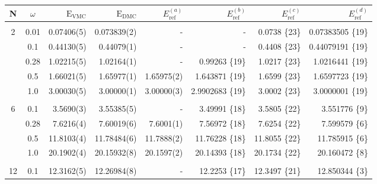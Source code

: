 % 


\setlength{\tabcolsep}{5pt}
\begin{table}
\begin{center}
\begin{tabular}{cc|rrrrrr}
    N     & $\omega$ & $\mathrm{E_{VMC}}$ & $\mathrm{E_{DMC}}$ & $E_\mathrm{ref}^{(a)}$& $E_\mathrm{ref}^{(b)}$ & $E_\mathrm{ref}^{(c)}$ & $E_\mathrm{ref}^{(d)}$\\
\hline\hline
\multicolumn{8}{c}{} \\
    2     &   0.01   & 0.07406(5)  & 0.073839(2)  & -		& -			& 0.0738 \{23\} & 0.07383505 \{19\}\\
          &   0.1    & 0.44130(5)  & 0.44079(1)   & - 		& - 			& 0.4408 \{23\} & 0.44079191 \{19\}\\
          &   0.28   & 1.02215(5)  & 1.02164(1)   & -		&0.99263 \{19\} 	& 1.0217 \{23\}  & 1.0216441 \{19\}\\
          &   0.5    & 1.66021(5)  & 1.65977(1)   & 1.65975(2)&1.643871 \{19\}	& 1.6599 \{23\}  & 1.6597723 \{19\}\\
          &   1.0    & 3.00030(5)  & 3.00000(1)   & 3.00000(3)&2.9902683 \{19\}	& 3.0002 \{23\}  & 3.0000001 \{19\}\\
\cline{2-8}
\multicolumn{8}{c}{} \\
    6     &   0.1    &  3.5690(3)  &  3.55385(5)  & -		&3.49991 \{18\} 	& 3.5805 \{22\}  & 3.551776 \{9\}\\
          &   0.28   &  7.6216(4)  &  7.60019(6)  & 7.6001(1) &7.56972 \{18\} 	& 7.6254 \{22\}  & 7.599579 \{6\}\\
          &   0.5    & 11.8103(4)  & 11.78484(6)  & 11.7888(2)&11.76228 \{18\}	& 11.8055 \{22\} & 11.785915 \{6\}\\
          &   1.0    & 20.1902(4)  & 20.15932(8)  & 20.1597(2)&20.14393 \{18\}	& 20.1734 \{22\} & 20.160472 \{8\}\\
\cline{2-8}
\multicolumn{8}{c}{} \\
    12    &   0.1    & 12.3162(5)  & 12.26984(8)  & - 		&12.2253 \{17\} 	& 12.3497 \{21\} & 12.850344 \{3\}\\

\end{tabular}
\end{center}
\end{table}
